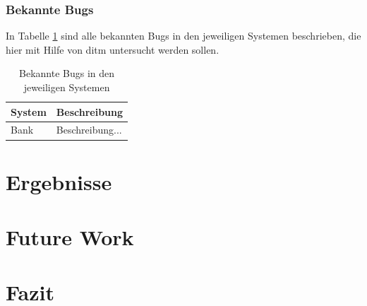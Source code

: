 \documentclass[12pt,a4paper]{report}
\begin{document}
\subsection{Bekannte Bugs}
In Tabelle \ref{tab:known_bugs} sind alle bekannten Bugs in den jeweiligen Systemen beschrieben, die hier mit Hilfe von ditm
untersucht werden sollen.
\begin{table}[H]
	\centering
	\caption{Bekannte Bugs in den jeweiligen Systemen}
	\label{tab:known_bugs}
	\begin{tabular}{|l|l|}
		\hline
		System & Beschreibung    \\ \hline
		Bank   & Beschreibung... \\ \hline
	\end{tabular}
\end{table}

\chapter{Ergebnisse}
\chapter{Future Work}




\chapter{Fazit}

\printbibliography
\end{document}
